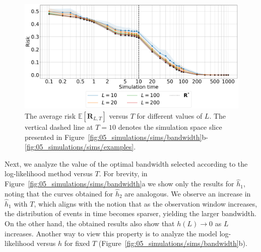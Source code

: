\documentclass[lettersize,journal,onecolumn]{IEEEtran}
\theoremstyle{definition}
\newcommand{\figurewidth}{0.5\columnwidth}  %
\renewcommand{\figurename}{Figure}
\newcommand{\E}[1]{\mathbb{E}\left[#1\right]}
\begin{document}
\begin{figure}[!t]
	\includegraphics[width=\figurewidth]{pawla3}
	\centering
	\caption{
		The average risk $\E{\mathbf{R}_{L,T}}$ versus $T$ for different values of $L$. 
		The vertical dashed line at $T=10$ denotes the simulation space slice presented 
		in \figurename~\ref{fig:05_simulations/sims/bandwidth}b-\ref{fig:05_simulations/sims/examples}.
	}
	\label{fig:05_simulations/sims/time}
\end{figure}

Next, we analyze the value of the optimal bandwidth selected according to the 
log-likelihood method versus $T$. For brevity, in 
\figurename~\ref{fig:05_simulations/sims/bandwidth}a we show only the results for 
$\widehat{h}_{1}$, noting that the curves obtained for $\widehat{h}_{2}$ are analogous. 
We observe an increase in $\widehat{h}_{1}$ with $T$, which aligns with the notion that 
as the observation window increases, the distribution of events in time becomes 
sparser, yielding the larger bandwidth. On the other hand, the obtained results also show 
that $h(L)\to0$ as $L$ increases. Another way to view this property is to analyze the 
model log-likelihood versus $h$ for fixed $T$ 
(\figurename~\ref{fig:05_simulations/sims/bandwidth}b). 
\end{document}
